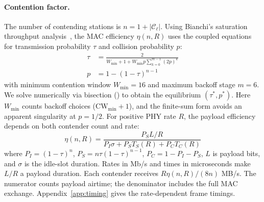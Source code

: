 \documentclass[conference]{IEEEtran}
\begin{document}
\paragraph{Contention factor.}
The number of contending stations is $n = 1 + |\mathcal{C}_\ell|$.  Using
Bianchi's saturation throughput analysis~\cite{bianchi2000}, the MAC
efficiency $\eta(n,R)$ uses the coupled equations for transmission
probability $\tau$ and collision probability $p$:
\begin{align}
\tau &= \frac{2}{W_{\min}+1+W_{\min}p\sum_{k=0}^{m-1}(2p)^k} \label{eq:tau} \\
p &= 1 - (1 - \tau)^{n-1} \label{eq:p}
\end{align}
with minimum contention window $W_{\min} = 16$ and maximum backoff stage
$m = 6$.  We solve numerically via bisection
() to obtain the equilibrium $(\tau^*, p^*)$.
Here $W_{\min}$ counts backoff choices ($\mathrm{CW}_{\min}+1$), and the
finite-sum form avoids an apparent singularity at $p=1/2$.
For positive PHY rate $R$, the payload efficiency depends on both contender count and rate:
\begin{equation}
\eta(n,R)=\frac{P_S L/R}{P_I\sigma+P_ST_S(R)+P_CT_C(R)}
\label{eq:eta}
\end{equation}
where $P_I=(1-\tau)^n$, $P_S=n\tau(1-\tau)^{n-1}$, $P_C=1-P_I-P_S$,
$L$ is payload bits, and $\sigma$ is the idle-slot duration. Rates in
Mb/s and times in microseconds make $L/R$ a payload duration. Each
contender receives $R\eta(n,R)/(8n)$ MB/s. The numerator counts payload
airtime; the denominator includes the full MAC exchange.
Appendix~\ref{app:timing} gives the rate-dependent frame timings.
\end{document}
